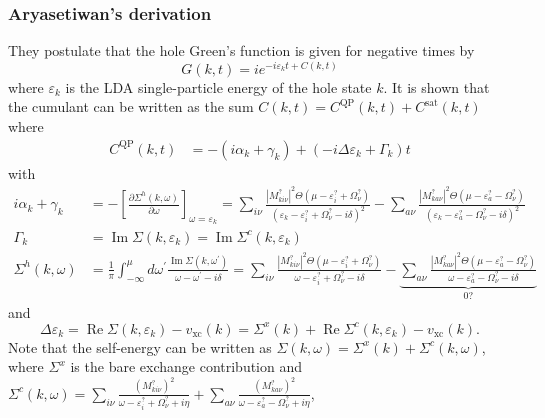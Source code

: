 \subsubsection{Aryasetiwan's derivation}
They postulate that the hole Green's function is given for negative times by 
\begin{equation}
G(k, t)=i e^{-i \varepsilon_k t+C(k, t)}
\end{equation}
where $\varepsilon_k$ is the LDA single-particle energy of the hole state $k$. It is shown that the cumulant can be written as the sum $
C(k, t)=C^{\text{QP}}(k, t)+C^{\text{sat}}(k, t)$
where
\begin{align}
    C^{\text{QP}}(k,t) & =-\left(i \alpha_k+\gamma_k\right)+\left(-i \Delta \varepsilon_k+\Gamma_k\right) t 
\end{align}
with
\begin{align}
i \alpha_k+\gamma_k & =-\left[\frac{\partial \Sigma^h(k, \omega)}{\partial \omega}\right]_{\omega=\varepsilon_k} = \sum_{i \nu} \frac{\left|M_{k i \nu}^?\right|^2 \Theta\left(\mu-\varepsilon_i^?+\Omega_\nu^?\right)}{\left(\varepsilon_k-\varepsilon_i^?+\Omega_\nu^?-i \delta\right)^2} - \sum_{a \nu} \frac{\left|M_{k a \nu}^?\right|^2 \Theta\left(\mu-\varepsilon_a^?-\Omega_\nu^?\right)}{\left(\varepsilon_k-\varepsilon_a^?- \Omega_\nu^?-i \delta\right)^2} \\
\Gamma_k & =\operatorname{Im} \Sigma\left(k, \varepsilon_k\right)  = \operatorname{Im} \Sigma^c(k, \varepsilon_k)\\
\Sigma^h(k, \omega) & =\frac{1}{\pi} \int_{-\infty}^\mu d \omega^{\prime} \frac{\operatorname{Im} \Sigma\left(k, \omega^{\prime}\right)}{\omega-\omega^{\prime}-i \delta} =\sum_{i \nu} \frac{\left|M_{k i \nu}^?\right|^2 \Theta\left(\mu-\varepsilon_i^?+\Omega_\nu^?\right)}{\omega-\varepsilon_i^?+\Omega_\nu^?-i \delta}-\underbrace{\sum_{a \nu} \frac{\left|M_{k a \nu}^?\right|^2 \Theta\left(\mu-\varepsilon_a^?-\Omega_\nu^?\right)}{\omega-\varepsilon_a^?-\Omega_\nu^?-i \delta}}_{0?}
\end{align}
and
\begin{equation}
\Delta \varepsilon_k=\operatorname{Re} \Sigma\left(k, \varepsilon_k\right)-v_{\mathrm{xc}}(k) = \Sigma^x(k) + \operatorname{Re} \Sigma^c(k,\varepsilon_k) - v_{\mathrm{xc}}(k).
\end{equation}
Note that the self-energy can be written as $\Sigma(k,\omega ) = \Sigma^x(k) + \Sigma^c(k,\omega)$, where $\Sigma^x$ is the bare exchange contribution and $\Sigma^c(k,\omega)=\sum_{i\nu} \frac{\left(M_{ki\nu}^?\right)^2}{\omega  - \varepsilon_i^{?} + \Omega_\nu^? + i \eta} + \sum_{a\nu} \frac{\left(M_{ka\nu}^?\right)^2}{\omega  - \varepsilon_a^{?} - \Omega_\nu^? + i \eta}$,
